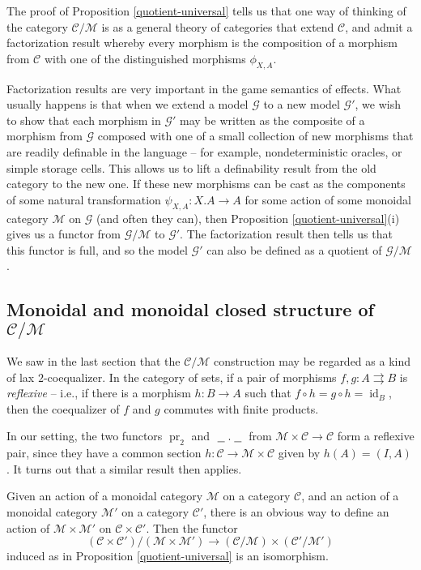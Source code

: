 \documentclass{svproc}
\newcommand\C{\mathcal{C}}
\newcommand\G{\mathcal{G}}
\newcommand\M{\mathcal{M}}
\DeclareMathOperator\pr{pr}
\DeclareMathOperator\id{id}
\newcommand*\from{\colon}
\newcommand{\0}{{\mathtt{0}}} \newcommand{\com}{{\mathtt{com}}}
\newcommand{\blank}{\;\underline{\hspace{1.5ex}}\;}
\begin{document}
\begin{remark}
  The proof of Proposition \ref{quotient-universal} tells us that one way of thinking of the category $\C/\M$ is as a general theory of categories that extend $\C$, and admit a factorization result whereby every morphism is the composition of a morphism from $\C$ with one of the distinguished morphisms $\phi_{X,A}$.

  Factorization results are very important in the game semantics of effects.  
  What usually happens is that when we extend a model $\G$ to a new model $\G'$, we wish to show that each morphism in $\G'$ may be written as the composite of a morphism from $\G$ composed with one of a small collection of new morphisms that are readily definable in the language -- for example, nondeterministic oracles, or simple storage cells.  
  This allows us to lift a definability result from the old category to the new one.  
  If these new morphisms can be cast as the components of some natural transformation $\psi_{X,A}\from X.A \to A$ for some action of some monoidal category $\M$ on $\G$ (and often they can), then Proposition \ref{quotient-universal}(i) gives us a functor from $\G/\M$ to $\G'$.  
  The factorization result then tells us that this functor is full, and so the model $\G'$ can also be defined as a quotient of $\G/\M$.
\end{remark}

\subsection{Monoidal and monoidal closed structure of $\C/\M$}

We saw in the last section that the $\C/\M$ construction may be regarded as a kind of lax $2$-coequalizer.  
In the category of sets, if a pair of morphisms $f,g\from A \rightrightarrows B$ is \emph{reflexive} -- i.e., if there is a morphism $h\from B \to A$ such that $f\circ h = g\circ h = \id_B$, then the coequalizer of $f$ and $g$ commutes with finite products.  

In our setting, the two functors $\pr_2$ and $\blank.\blank$ from $\M\times\C \to \C$ form a reflexive pair, since they have a common section $h\from \C \to \M\times \C$ given by $h(A) = (I, A)$.  
It turns out that a similar result then applies.

\begin{proposition}
  Given an action of a monoidal category $\M$ on a category $\C$, and an action of a monoidal category $\M'$ on a category $\C'$, there is an obvious way to define an action of $\M\times\M'$ on $\C\times\C'$.  
  Then the functor
  \[
    (\C\times\C')/(\M\times\M') \to (\C/\M) \times (\C'/\M')
    \]
  induced as in Proposition \ref{quotient-universal} is an isomorphism.
  \label{monoidality}
\end{proposition}
\end{document}
